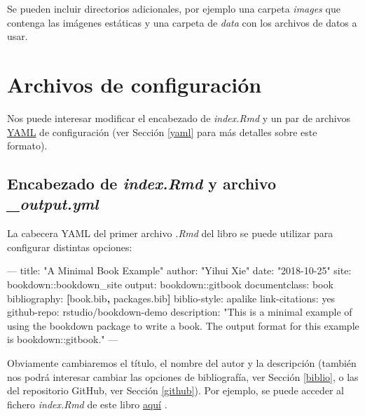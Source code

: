 \documentclass[]{book}
\newenvironment{Shaded}{\begin{snugshade}}{\end{snugshade}}
\newcommand{\KeywordTok}[1]{\textcolor[rgb]{0.13,0.29,0.53}{\textbf{#1}}}
\newcommand{\StringTok}[1]{\textcolor[rgb]{0.31,0.60,0.02}{#1}}
\newcommand{\OtherTok}[1]{\textcolor[rgb]{0.56,0.35,0.01}{#1}}
\newcommand{\FunctionTok}[1]{\textcolor[rgb]{0.00,0.00,0.00}{#1}}
\newcommand{\AttributeTok}[1]{\textcolor[rgb]{0.77,0.63,0.00}{#1}}
\newcommand{\NormalTok}[1]{#1}
\theoremstyle{definition}
\theoremstyle{definition}
\theoremstyle{definition}
\theoremstyle{remark}
\begin{document}
Se pueden incluir directorios adicionales, por ejemplo una carpeta
\emph{images} que contenga las imágenes estáticas y una carpeta de
\emph{data} con los archivos de datos a usar.

\chapter{Archivos de configuración}\label{archivos-de-configuracion}

Nos puede interesar modificar el encabezado de \emph{index.Rmd} y un par
de archivos \href{https://en.wikipedia.org/wiki/YAML}{YAML} de
configuración (ver Sección \ref{yaml} para más detalles sobre este
formato).

\section{\texorpdfstring{Encabezado de \emph{index.Rmd} y archivo
\emph{\_output.yml}}{Encabezado de index.Rmd y archivo \_output.yml}}\label{encabezado-de-index.rmd-y-archivo-_output.yml}

La cabecera YAML del primer archivo \emph{.Rmd} del libro se puede
utilizar para configurar distintas opciones:

\begin{Shaded}
\begin{Highlighting}[]
\OtherTok{--- }
\FunctionTok{title:}\AttributeTok{ }\StringTok{"A Minimal Book Example"}
\FunctionTok{author:}\AttributeTok{ }\StringTok{"Yihui Xie"}
\FunctionTok{date:}\AttributeTok{ }\StringTok{"2018-10-25"}
\FunctionTok{site:}\AttributeTok{ bookdown::bookdown_site}
\FunctionTok{output:}\AttributeTok{ bookdown::gitbook}
\FunctionTok{documentclass:}\AttributeTok{ book}
\FunctionTok{bibliography:}\AttributeTok{ }\KeywordTok{[}\NormalTok{book.bib}\KeywordTok{,}\NormalTok{ packages.bib}\KeywordTok{]}
\FunctionTok{biblio-style:}\AttributeTok{ apalike}
\FunctionTok{link-citations:}\AttributeTok{ yes}
\FunctionTok{github-repo:}\AttributeTok{ rstudio/bookdown-demo}
\FunctionTok{description:}\AttributeTok{ }\StringTok{"This is a minimal example of using the bookdown package to write a book.}
\StringTok{The output format for this example is bookdown::gitbook."}
\OtherTok{---}
\end{Highlighting}
\end{Shaded}

Obviamente cambiaremos el título, el nombre del autor y la descripción
(también nos podrá interesar cambiar las opciones de bibliografía, ver
Sección \ref{biblio}, o las del repositorio GitHub, ver Sección
\ref{github}). Por ejemplo, se puede acceder al fichero \emph{index.Rmd}
de este libro
\href{https://github.com/rubenfcasal/bookdown_intro/raw/master/index.Rmd}{aquí}
.
\end{document}
